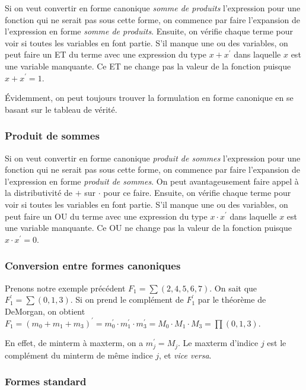 \documentclass[11pt]{article}
\begin{document}
Si on veut convertir en forme canonique \emph{somme de produits} l'expression
pour une fonction qui ne serait pas sous cette forme, on commence par
faire l'expansion de l'expression en forme \emph{somme de produits}. Ensuite,
on vérifie chaque terme pour voir si toutes les variables en font
partie. S'il manque une ou des variables, on peut faire un ET du
terme avec une expression du type \(x + x^\prime\) dans laquelle \(x\)
est une variable manquante. Ce ET ne change pas la valeur de la
fonction puisque \(x + x^\prime = 1\).

Évidemment, on peut toujours trouver la formulation en forme canonique
en se basant sur le tableau de vérité.

\subsubsection{Produit de sommes}
\label{sec:org0788147}

Si on veut convertir en forme canonique \emph{produit de sommes} l'expression
pour une fonction qui ne serait pas sous cette forme, on commence par
faire l'expansion de l'expression en forme \emph{produit de sommes}. On peut
avantageusement faire appel à la distributivité de \(+\) sur \(\cdot\)
pour ce faire. Ensuite, on vérifie chaque terme pour voir si toutes
les variables en font partie. S'il manque une ou des variables, on
peut faire un OU du terme avec une expression du type \(x \cdot
x^\prime\) dans laquelle \(x\) est une variable manquante. Ce OU ne
change pas la valeur de la fonction puisque \(x \cdot x^\prime = 0\).

\subsubsection{Conversion entre formes canoniques}
\label{sec:org6f8fb2d}

Prenons notre exemple précédent \(F_1 = \sum (2, 4, 5, 6, 7)\). On
sait que \(F_1^\prime = \sum (0,1,3)\). Si on prend le complément de
\(F_1^\prime\) par le théorème de DeMorgan, on obtient \(F_1 = (m_0 +
m_1 + m_3)^\prime = m_0^\prime \cdot m_1^\prime \cdot m_3^\prime = M_0
\cdot M_1 \cdot M_3 = \prod (0,1,3)\).

En effet, de minterm à maxterm, on a \(m_j^\prime = M_j\). Le maxterm
d'indice \(j\) est le complément du minterm de même indice \(j\), et
\emph{vice versa}.

\subsubsection{Formes standard}
\label{sec:org3c86633}
\end{document}
